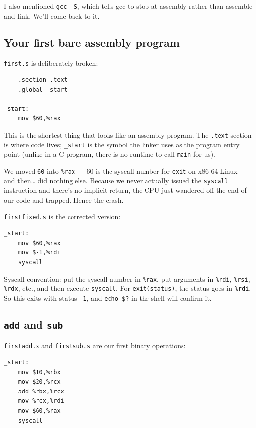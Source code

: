 \documentclass[11pt]{article}
\begin{document}
I also mentioned \texttt{gcc -S}, which tells gcc to stop at assembly
rather than assemble and link. We'll come back to it.

\subsection*{Your first bare assembly program}

\texttt{first.s} is deliberately broken:

\begin{lstlisting}
    .section .text
    .global _start

_start:
    mov $60,%rax
\end{lstlisting}

This is the shortest thing that looks like an assembly program. The
\texttt{.text} section is where code lives; \texttt{\_start} is the
symbol the linker uses as the program entry point (unlike in a C
program, there is no runtime to call \texttt{main} for us).

We moved \texttt{60} into \texttt{\%rax} --- 60 is the syscall number
for \texttt{exit} on x86-64 Linux --- and then\ldots{} did nothing
else. Because we never actually issued the \texttt{syscall}
instruction and there's no implicit return, the CPU just wandered off
the end of our code and trapped. Hence the crash.

\texttt{firstfixed.s} is the corrected version:

\begin{lstlisting}
_start:
    mov $60,%rax
    mov $-1,%rdi
    syscall
\end{lstlisting}

Syscall convention: put the syscall number in \texttt{\%rax}, put
arguments in \texttt{\%rdi}, \texttt{\%rsi}, \texttt{\%rdx}, etc., and
then execute \texttt{syscall}. For \texttt{exit(status)}, the status
goes in \texttt{\%rdi}. So this exits with status \texttt{-1}, and
\texttt{echo \$?} in the shell will confirm it.

\subsection*{\texttt{add} and \texttt{sub}}

\texttt{firstadd.s} and \texttt{firstsub.s} are our first binary
operations:

\begin{lstlisting}
_start:
    mov $10,%rbx
    mov $20,%rcx
    add %rbx,%rcx
    mov %rcx,%rdi
    mov $60,%rax
    syscall
\end{lstlisting}
\end{document}
